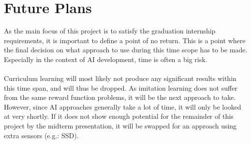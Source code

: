 \section{Future Plans}
As the main focus of this project is to satisfy the graduation internship requirements, it is important to define a point of no return. This is a point where the final decision on what approach to use during this time scope has to be made. Especially in the context of \gls{AI} development, time is often a big risk. 
\\\\
Curriculum learning will most likely not produce any significant results within this time span, and will thus be dropped. As imitation learning does not suffer from the same reward function problems, it will be the next approach to take. However, since \gls{AI} approaches generally take a lot of time, it will only be looked at very shortly. If it does not show enough potential for the remainder of this project by the midterm presentation, it will be swapped for an approach using extra sensors (e.g.: \gls{SSD}).